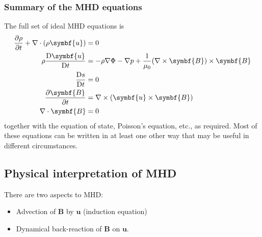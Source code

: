 \documentclass{jknotes}
\begin{document}
\subsubsection{Summary of the MHD equations}
The full set of ideal MHD equations is
\begin{align}
	\frac{\partial \rho}{\partial t} + \nabla \cdot (\rho \symbf{u}) &= 0 \\
	\rho \frac{\diffD \symbf{u}}{\diffD t} &= - \rho \nabla \Phi - \nabla p +
	\frac{1}{\mu_0}(\nabla \times \symbf{B})\times\symbf{B} \\
	\frac{\diffD s}{\diffD t} &= 0 \\
	\frac{\partial \symbf{B}}{\partial t} &= \nabla \times (\symbf{u} \times
	\symbf{B}) \\
	\nabla \cdot \symbf{B} &= 0
\end{align}
together with the equation of state, Poisson's equation, etc., as required.
Most of these equations can be written in at least one other way that may be
useful in different circumstances.

\subsection{Physical interpretation of MHD}
There are two aspects to MHD:
\begin{itemize}
	\item Advection of $\symbf{B}$ by $\symbf{u}$ (induction equation)
	\item Dynamical back-reaction of $\symbf{B}$ on $\symbf{u}$.
\end{itemize}
\end{document}
